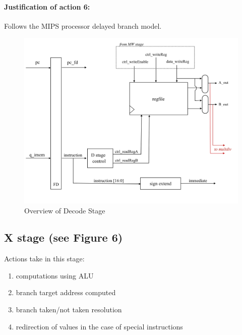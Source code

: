 \documentclass[letterpaper]{article}
\begin{document}
\paragraph{Justification of action 6:} Follows the MIPS processor delayed branch model.
\begin{figure}[h]
    \centering
    \includegraphics[width=\textwidth]{Decode.png}
    \caption{Overview of Decode Stage}
    \label{fig:my_label}
\end{figure}
\clearpage
\subsection{X stage (see Figure 6)}
Actions take in this stage:
\begin{enumerate}
    \item computations using ALU
    \item branch target address computed
    \item branch taken/not taken resolution
    \item redirection of values in the case of special instructions
\end{enumerate}
\end{document}
